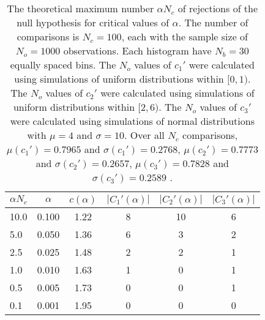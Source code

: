 \begin{table}[h!]
\begin{center}
\begin{tabular}{| l | c | c | c | c | c |}\hline
$\alpha N_c$ & $\alpha$ & $c(\alpha)$ & $|C_1'(\alpha)|$ & $|C_2'(\alpha)|$ & $|C_3'(\alpha)|$ \\\hline
10.0 & 0.100 & 1.22 & 8 & 10 & 6 \\\hline
5.0 & 0.050 & 1.36 & 6 & 3 & 2 \\\hline
2.5 & 0.025 & 1.48 & 2 & 2 & 1 \\\hline
1.0 & 0.010 & 1.63 & 1 & 0 & 1 \\\hline
0.5 & 0.005 & 1.73 & 0 & 0 & 1 \\\hline
0.1 & 0.001 & 1.95 & 0 & 0 & 0 \\\hline
\end{tabular}
\caption{The theoretical maximum number $\alpha N_c$ of rejections
of the null hypothesis for critical values of $\alpha$.
The number of comparisons is $N_c=100$,
each with the sample size of $N_o=1000$ observations.
Each histogram have $N_b=30$ equally spaced bins.
The $N_o$ values of $c_1'$ were calculated using simulations of
 uniform distributions within $[0,1)$.
The $N_o$ values of $c_2'$ were calculated using simulations of
 uniform distributions within $[2,6)$.
The $N_o$ values of $c_3'$ were calculated using simulations of
 normal distributions with $\mu=4$ and $\sigma=10$.
Over all $N_c$ comparisons,
 $\mu(c_1')=0.7965$ and $\sigma(c_1')=0.2768$,
 $\mu(c_2')=0.7773$ and $\sigma(c_2')=0.2657$,
 $\mu(c_3')=0.7828$ and $\sigma(c_3')=0.2589$ .
}
\end{center}
\end{table}